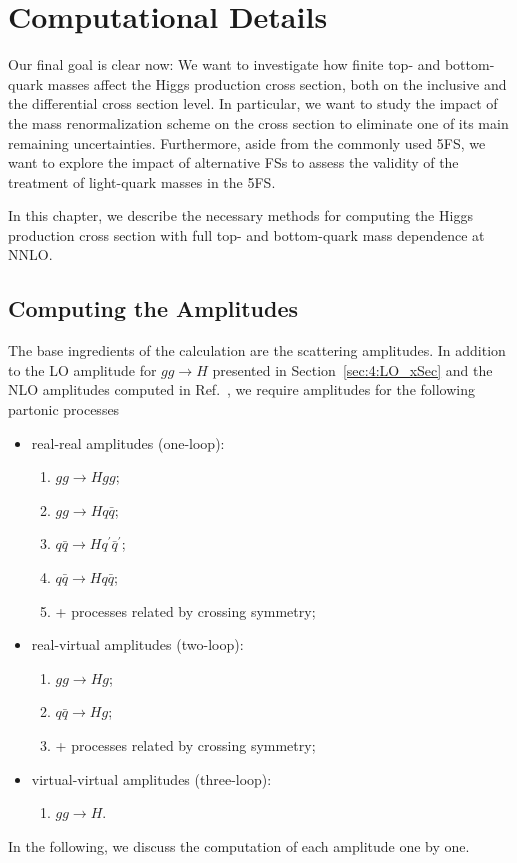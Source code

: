 
\chapter{Computational Details}\label{chap:5:computational_details}

Our final goal is clear now: We want to investigate how finite top- and bottom-quark masses affect the Higgs production cross section, both on the inclusive and the differential cross section level. In particular, we want to study the impact of the mass renormalization scheme on the cross section to eliminate one of its main remaining uncertainties. Furthermore, aside from the commonly used 5\acs{FS}, we want to explore the impact of alternative \acs{FS}s to assess the validity of the treatment of light-quark masses in the 5\acs{FS}.

In this chapter, we describe the necessary methods for computing the Higgs production cross section with full top- and bottom-quark mass dependence at \acs{NNLO}.

\section{Computing the Amplitudes}
The base ingredients of the calculation are the scattering amplitudes. In addition to the \acs{LO} amplitude for $gg \rightarrow H$ presented in Section~\ref{sec:4:LO_xSec} and the \acs{NLO} amplitudes computed in Ref.~\cite{Graudenz:1992pv}, we require amplitudes for the following partonic processes
\begin{itemize}
  \item real-real amplitudes (one-loop):
  \begin{enumerate}
    \item $gg \rightarrow H gg$;
    \item $gg \rightarrow H q \bar{q}$;
    \item $q\bar{q} \rightarrow H q^\prime \bar{q}^\prime$;
    \item $q\bar{q} \rightarrow H q \bar{q}$;
    \item + processes related by crossing symmetry;
  \end{enumerate}
  \item real-virtual amplitudes (two-loop):
  \begin{enumerate}
    \item $gg \rightarrow Hg$;
    \item $q \bar{q} \rightarrow H g$;
    \item + processes related by crossing symmetry;
  \end{enumerate}
  \item virtual-virtual amplitudes (three-loop):
  \begin{enumerate}
    \item $g g \rightarrow H$.
  \end{enumerate}
\end{itemize}
In the following, we discuss the computation of each amplitude one by one.

